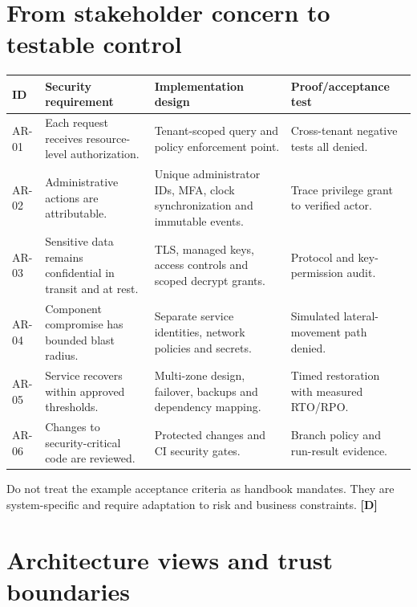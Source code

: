 \documentclass[10pt,letterpaper,oneside]{article}
\newcommand{\designed}{\textsf{\color{accent}\textbf{[D]}}}
\begin{document}
\section{From stakeholder concern to testable control}
\par\medskip\noindent\begin{longtable}{@{}p{}p{}p{}p{}@{}}\toprule
ID & Security requirement & Implementation design & Proof/acceptance test \\ \midrule\endhead
AR-01 & Each request receives resource-level authorization. & Tenant-scoped query and policy enforcement point. & Cross-tenant negative tests all denied.\\
AR-02 & Administrative actions are attributable. & Unique administrator IDs, MFA, clock synchronization and immutable events. & Trace privilege grant to verified actor.\\
AR-03 & Sensitive data remains confidential in transit and at rest. & TLS, managed keys, access controls and scoped decrypt grants. & Protocol and key-permission audit.\\
AR-04 & Component compromise has bounded blast radius. & Separate service identities, network policies and secrets. & Simulated lateral-movement path denied.\\
AR-05 & Service recovers within approved thresholds. & Multi-zone design, failover, backups and dependency mapping. & Timed restoration with measured RTO/RPO.\\
AR-06 & Changes to security-critical code are reviewed. & Protected changes and CI security gates. & Branch policy and run-result evidence.\\
\bottomrule\end{longtable}\par\medskip
Do not treat the example acceptance criteria as handbook mandates. They are system-specific and require adaptation to risk and business constraints. \designed{}

\section{Architecture views and trust boundaries}
\end{document}

